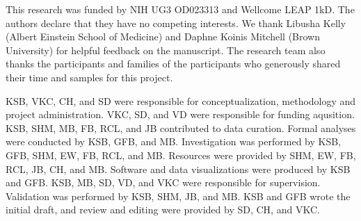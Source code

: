 \documentclass{article}
\begin{document}
This research was funded by NIH UG3 OD023313 and Wellcome LEAP 1kD.
The authors declare that they have no competing interests.
We thank Libusha Kelly (Albert Einstein School of Medicine) and Daphne Koinis Mitchell (Brown University)
for helpful feedback on the manuscript. The research team also thanks the participants and families
of the participants who generously shared their time and samples for this project.


KSB, VKC, CH, and SD were responsible for conceptualization,
methodology and project administration.
VKC, SD, and VD were responsible for funding aqusition.
KSB, SHM, MB, FB, RCL, and JB contributed to data curation.
Formal analyses were conducted by KSB, GFB, and MB.
Investigation was performed by KSB, GFB, SHM, EW, FB, RCL, and MB.
Resources were provided by SHM, EW, FB, RCL, JB, CH, and MB.
Software and data visualizations were produced by KSB and GFB.
KSB, MB, SD, VD, and VKC were responsible for supervision.
Validation was performed by KSB, SHM, JB, and MB.
KSB and GFB wrote the initial draft, 
and review and editing were provided by SD, CH, and VKC.
\end{document}
